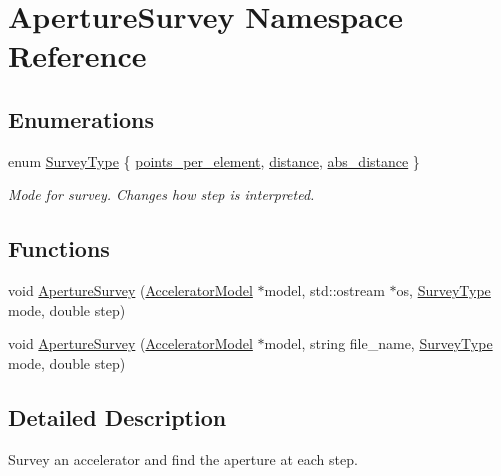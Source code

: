 \hypertarget{namespaceApertureSurvey}{}\section{Aperture\+Survey Namespace Reference}
\label{namespaceApertureSurvey}
\subsection*{Enumerations}
\begin{DoxyCompactItemize}
\item 
enum \hyperlink{namespaceApertureSurvey_a8824104e7e9b8cb1dd046f47a386bf87}{Survey\+Type} \{ \hyperlink{namespaceApertureSurvey_a8824104e7e9b8cb1dd046f47a386bf87a6ef37e5d19cd4b8187805450cc0a80ec}{points\+\_\+per\+\_\+element}, 
\hyperlink{namespaceApertureSurvey_a8824104e7e9b8cb1dd046f47a386bf87a33db6949b5a66c629475f89efd4adb47}{distance}, 
\hyperlink{namespaceApertureSurvey_a8824104e7e9b8cb1dd046f47a386bf87a071e0c893aafe8058d54ef4cf1ed1276}{abs\+\_\+distance}
 \}\begin{DoxyCompactList}\small\item\em Mode for survey. Changes how step is interpreted. \end{DoxyCompactList}
\end{DoxyCompactItemize}
\subsection*{Functions}
\begin{DoxyCompactItemize}
\item 
void \hyperlink{namespaceApertureSurvey_a793a09ef12301135ec082ea5814e67e8}{Aperture\+Survey} (\hyperlink{classAcceleratorModel}{Accelerator\+Model} $\ast$model, std\+::ostream $\ast$os, \hyperlink{namespaceApertureSurvey_a8824104e7e9b8cb1dd046f47a386bf87}{Survey\+Type} mode, double step)
\item 
void \hyperlink{namespaceApertureSurvey_affc929ffdf9578dd74e0620638de0d2b}{Aperture\+Survey} (\hyperlink{classAcceleratorModel}{Accelerator\+Model} $\ast$model, string file\+\_\+name, \hyperlink{namespaceApertureSurvey_a8824104e7e9b8cb1dd046f47a386bf87}{Survey\+Type} mode, double step)
\end{DoxyCompactItemize}


\subsection{Detailed Description}
Survey an accelerator and find the aperture at each step.

